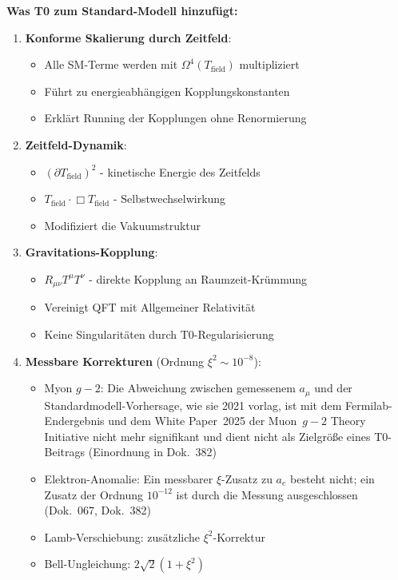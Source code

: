 	\textbf{Was T0 zum Standard-Modell hinzufügt:}
	
	\begin{tcolorbox}[colback=blue!5!white,colframe=blue!75!black,title=T0-Beiträge zur erweiterten Lagrange-Dichte]
		\begin{enumerate}
			\item \textbf{Konforme Skalierung durch Zeitfeld}:
			\begin{itemize}
				\item Alle SM-Terme werden mit $\Omega^4(T_{\text{field}})$ multipliziert
				\item Führt zu energieabhängigen Kopplungskonstanten
				\item Erklärt Running der Kopplungen ohne Renormierung
			\end{itemize}
			
			\item \textbf{Zeitfeld-Dynamik}:
			\begin{itemize}
				\item $(\partial T_{\text{field}})^2$ - kinetische Energie des Zeitfelds
				\item $T_{\text{field}} \cdot \Box T_{\text{field}}$ - Selbstwechselwirkung
				\item Modifiziert die Vakuumstruktur
			\end{itemize}
			
			\item \textbf{Gravitations-Kopplung}:
			\begin{itemize}
				\item $R_{\mu\nu} T^{\mu} T^{\nu}$ - direkte Kopplung an Raumzeit-Krümmung
				\item Vereinigt QFT mit Allgemeiner Relativität
				\item Keine Singularitäten durch T0-Regularisierung
			\end{itemize}
			
			\item \textbf{Messbare Korrekturen} (Ordnung $\xi^2 \sim 10^{-8}$):
			\begin{itemize}
				\item Myon $g-2$: Die Abweichung zwischen gemessenem $a_\mu$ und der Standardmodell-Vorhersage, wie sie 2021 vorlag, ist mit dem Fermilab-Endergebnis und dem White Paper~2025 der Muon~$g-2$ Theory Initiative nicht mehr signifikant und dient nicht als Zielgröße eines T0-Beitrags (Einordnung in Dok.~382)
				\item Elektron-Anomalie: Ein messbarer $\xi$-Zusatz zu $a_e$ besteht nicht; ein Zusatz der Ordnung $10^{-12}$ ist durch die Messung ausgeschlossen (Dok.~067, Dok.~382)
				\item Lamb-Verschiebung: zusätzliche $\xi^2$-Korrektur
				\item Bell-Ungleichung: $2\sqrt{2}(1 + \xi^2)$
			\end{itemize}
		\end{enumerate}
	\end{tcolorbox}
	

